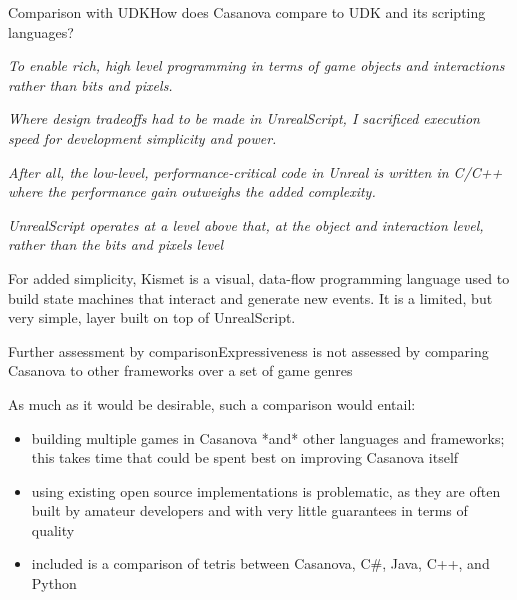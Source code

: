 \documentclass{beamer}
\begin{document}
\begin{slide}{Comparison with UDK}{How does Casanova compare to UDK and its scripting languages?}{
\item \textit{To enable rich, high level programming in terms of game objects and interactions rather than bits and pixels.}
\item \textit{Where design tradeoffs had to be made in UnrealScript, I sacrificed execution speed for development simplicity and power.}
\item \textit{After all, the low-level, performance-critical code in Unreal is written in C/C++ where the performance gain outweighs the added complexity.}
\item \textit{UnrealScript operates at a level above that, at the object and interaction level, rather than the bits and pixels level}
\item For added simplicity, Kismet is a visual, data-flow programming language used to build state machines that interact and generate new events. It is a limited, but very simple, layer built on top of UnrealScript.
}\end{slide}

\begin{slide}{Further assessment by comparison}{Expressiveness is not assessed by comparing Casanova to other frameworks over a set of game genres}{
\item As much as it would be desirable, such a comparison would entail:
\begin{itemize}
\item building multiple games in Casanova *and* other languages and frameworks; this takes time that could be spent best on improving Casanova itself
\item using existing open source implementations is problematic, as they are often built by amateur developers and with very little guarantees in terms of quality
\item included is a comparison of tetris between Casanova, C\#, Java, C++, and Python
\end{itemize}
}\end{slide}
\end{document}
